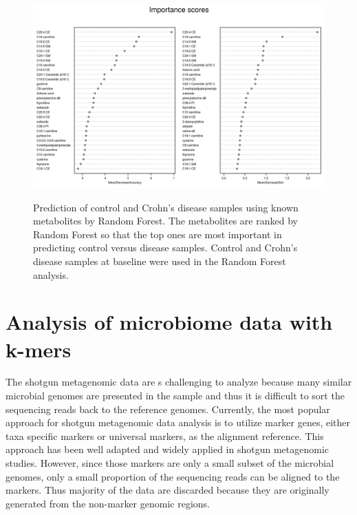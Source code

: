 \begin{figure}[hp]
\centering
{\includegraphics[scale=1.2,trim=0 0 290 30,clip]{Figure/F53_Metabolites_RF.png}
}
\caption[Prediction of control and Crohn's disease samples using known metabolites by Random Forest]{Prediction of control and Crohn's disease samples using known metabolites by Random Forest. The metabolites are ranked by Random Forest so that the top ones are most important in predicting control versus disease samples. Control and Crohn's disease samples at baseline were used in the Random Forest analysis. 
}
\label{F53_Metabolites_RF}
\end{figure}


\section{Analysis of microbiome data with k-mers} 
The shotgun metagenomic data are s challenging to analyze because many similar microbial genomes are presented in the sample and thus it is difficult to sort the sequencing reads back to the reference genomes. Currently, the most popular approach for shotgun metagenomic data analysis is to utilize marker genes, either taxa specific markers or universal markers, as the  alignment reference. This approach has been well adapted and widely applied in shotgun metagenomic studies. However, since those markers are only a small subset of the microbial genomes, only a small proportion of the sequencing reads can be aligned to the markers. Thus majority of the data are discarded because they are originally generated from the non-marker genomic regions. 

